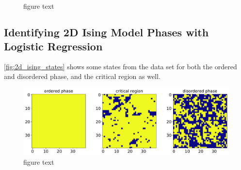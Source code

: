 \begin{figure}[H]
\centering
{}
\qquad
{}
\caption{figure text}
\label{fig:performance_lmbda_1d}
\end{figure}


\subsection{Identifying 2D Ising Model Phases with Logistic Regression}\label{sec:results logreg}

\autoref{fig:2d_ising_states} shows some states from the data set for both the ordered and disordered phase, and the critical region as well. 

\begin{figure}[H]
\begin{center}\includegraphics[scale=0.5]{latex/figures/ising_2d_states.pdf}
\end{center}
\caption{figure text}
\label{fig:2d_ising_states}
\end{figure}

